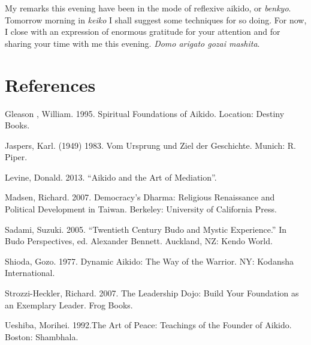 My remarks this evening have been in the mode of reflexive aikido, or \emph{benkyo}. Tomorrow morning in \emph{keiko} I shall suggest some techniques for so doing. For now, I close with an expression of enormous gratitude for your attention and for sharing your time with me this evening. \emph{Domo arigato gozai mashita}.

\section*{References}

\begin{list}{}{}
\item Gleason , William. 1995. Spiritual Foundations of Aikido. Location: Destiny Books. 
\item Jaspers, Karl. (1949) 1983. Vom Ursprung und Ziel der Geschichte. Munich: R. Piper.
\item Levine, Donald. 2013. ``Aikido and the Art of Mediation''. 
\item Madsen, Richard. 2007. Democracy's Dharma: Religious Renaissance and Political Development in Taiwan. Berkeley: University of California Press.
\item Sadami, Suzuki. 2005. ``Twentieth Century Budo and Mystic Experience.'' In Budo Perspectives, ed. Alexander Bennett. Auckland, NZ: Kendo World.
\item Shioda, Gozo. 1977. Dynamic Aikido: The Way of the Warrior. NY: Kodansha International.
\item Strozzi-Heckler, Richard. 2007. The Leadership Dojo: Build Your Foundation as an Exemplary Leader. Frog Books. 
\item Ueshiba, Morihei. 1992.The Art of Peace: Teachings of the Founder of Aikido. Boston: Shambhala.
\end{list}